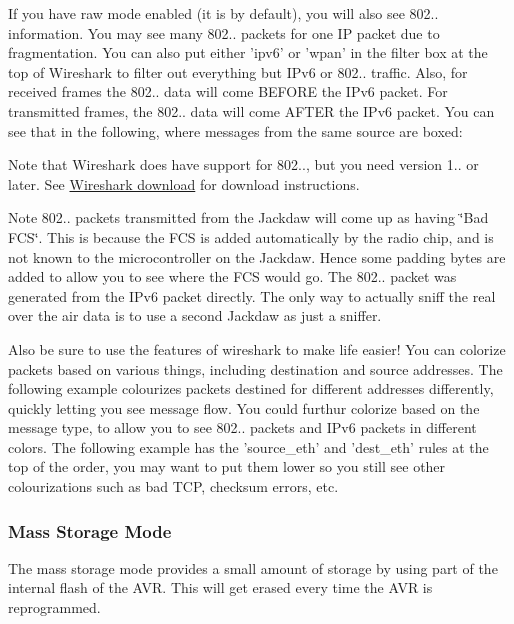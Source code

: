 \-If you have raw mode enabled (it is by default), you will also see 802.. information. \-You may see many 802.. packets for one \-I\-P packet due to fragmentation. \-You can also put either 'ipv6' or 'wpan' in the filter box at the top of \-Wireshark to filter out everything but \-I\-Pv6 or 802.. traffic. \-Also, for received frames the 802.. data will come \-B\-E\-F\-O\-R\-E the \-I\-Pv6 packet. \-For transmitted frames, the 802.. data will come \-A\-F\-T\-E\-R the \-I\-Pv6 packet. \-You can see that in the following, where messages from the same source are boxed\-:



\-Note that \-Wireshark does have support for 802.., but you need version 1.. or later. \-See \hyperlink{a00053_annex_wireshark}{\-Wireshark download} for download instructions.

\begin{DoxyNote}{\-Note}
802.. packets transmitted from the \-Jackdaw will come up as having \char`\"{}\-Bad F\-C\-S\char`\"{}. \-This is because the \-F\-C\-S is added automatically by the radio chip, and is not known to the microcontroller on the \-Jackdaw. \-Hence some padding bytes are added to allow you to see where the \-F\-C\-S would go. \-The 802.. packet was generated from the \-I\-Pv6 packet directly. \-The only way to actually sniff the real over the air data is to use a second \-Jackdaw as just a sniffer.
\end{DoxyNote}
\-Also be sure to use the features of wireshark to make life easier! \-You can colorize packets based on various things, including destination and source addresses. \-The following example colourizes packets destined for different addresses differently, quickly letting you see message flow. \-You could furthur colorize based on the message type, to allow you to see 802.. packets and \-I\-Pv6 packets in different colors. \-The following example has the 'source\-\_\-eth' and 'dest\-\_\-eth' rules at the top of the order, you may want to put them lower so you still see other colourizations such as bad \-T\-C\-P, checksum errors, etc.

\hypertarget{a00053_MassStorageMode}{}\subsubsection{\-Mass Storage Mode}\label{a00053_MassStorageMode}
\-The mass storage mode provides a small amount of storage by using part of the internal flash of the \-A\-V\-R. \-This will get erased every time the \-A\-V\-R is reprogrammed.

